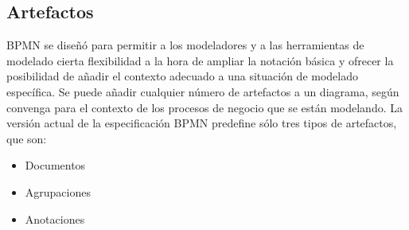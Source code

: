 \subsection{Artefactos}

BPMN se diseñó para permitir a los modeladores y a las herramientas de modelado cierta flexibilidad a la hora de ampliar la notación básica y ofrecer la posibilidad de añadir el contexto adecuado a una situación de modelado específica.
Se puede añadir cualquier número de artefactos a un diagrama, según convenga para el contexto de los procesos de negocio que se están modelando.
La versión actual de la especificación BPMN predefine sólo tres tipos de artefactos, que son:

\begin{itemize}
    \item Documentos
    \item Agrupaciones
    \item Anotaciones
\end{itemize}

